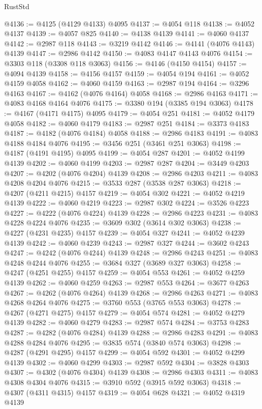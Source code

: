 \begin{lexlean}{RustStd}
\begin{coremodule}
@4136 := @4125 (@4129 @4133) @4095
@4137 := @4054 @118
@4138 := @4052 @4137
@4139 := @4057 @825
@4140 := @4138 @4139
@4141 := @4060 @4137
@4142 := @2987 @118
@4143 := @3219 @4142
@4146 := @4141 (@4076 @4143) @4139
@4147 := @2986 @4142
@4150 := @4083 @4147 @4143 @4076
@4154 := @3303 @118 (@3308 @118 @3063)
@4156 := @4146 (@4150 @4154)
@4157 := @4094 @4139
@4158 := @4156 @4157
@4159 := @4054 @194
@4161 := @4052 @4159 @4058
@4162 := @4060 @4159
@4163 := @2987 @194
@4164 := @3296 @4163
@4167 := @4162 (@4076 @4164) @4058
@4168 := @2986 @4163
@4171 := @4083 @4168 @4164 @4076
@4175 := @3380 @194 (@3385 @194 @3063)
@4178 := @4167 (@4171 @4175) @4095
@4179 := @4054 @251
@4181 := @4052 @4179 @4058
@4182 := @4060 @4179
@4183 := @2987 @251
@4184 := @3373 @4183
@4187 := @4182 (@4076 @4184) @4058
@4188 := @2986 @4183
@4191 := @4083 @4188 @4184 @4076
@4195 := @3456 @251 (@3461 @251 @3063)
@4198 := @4187 (@4191 @4195) @4095
@4199 := @4054 @287
@4201 := @4052 @4199 @4139
@4202 := @4060 @4199
@4203 := @2987 @287
@4204 := @3449 @4203
@4207 := @4202 (@4076 @4204) @4139
@4208 := @2986 @4203
@4211 := @4083 @4208 @4204 @4076
@4215 := @3533 @287 (@3538 @287 @3063)
@4218 := @4207 (@4211 @4215) @4157
@4219 := @4054 @302
@4221 := @4052 @4219 @4139
@4222 := @4060 @4219
@4223 := @2987 @302
@4224 := @3526 @4223
@4227 := @4222 (@4076 @4224) @4139
@4228 := @2986 @4223
@4231 := @4083 @4228 @4224 @4076
@4235 := @3609 @302 (@3614 @302 @3063)
@4238 := @4227 (@4231 @4235) @4157
@4239 := @4054 @327
@4241 := @4052 @4239 @4139
@4242 := @4060 @4239
@4243 := @2987 @327
@4244 := @3602 @4243
@4247 := @4242 (@4076 @4244) @4139
@4248 := @2986 @4243
@4251 := @4083 @4248 @4244 @4076
@4255 := @3684 @327 (@3689 @327 @3063)
@4258 := @4247 (@4251 @4255) @4157
@4259 := @4054 @553
@4261 := @4052 @4259 @4139
@4262 := @4060 @4259
@4263 := @2987 @553
@4264 := @3677 @4263
@4267 := @4262 (@4076 @4264) @4139
@4268 := @2986 @4263
@4271 := @4083 @4268 @4264 @4076
@4275 := @3760 @553 (@3765 @553 @3063)
@4278 := @4267 (@4271 @4275) @4157
@4279 := @4054 @574
@4281 := @4052 @4279 @4139
@4282 := @4060 @4279
@4283 := @2987 @574
@4284 := @3753 @4283
@4287 := @4282 (@4076 @4284) @4139
@4288 := @2986 @4283
@4291 := @4083 @4288 @4284 @4076
@4295 := @3835 @574 (@3840 @574 @3063)
@4298 := @4287 (@4291 @4295) @4157
@4299 := @4054 @592
@4301 := @4052 @4299 @4139
@4302 := @4060 @4299
@4303 := @2987 @592
@4304 := @3828 @4303
@4307 := @4302 (@4076 @4304) @4139
@4308 := @2986 @4303
@4311 := @4083 @4308 @4304 @4076
@4315 := @3910 @592 (@3915 @592 @3063)
@4318 := @4307 (@4311 @4315) @4157
@4319 := @4054 @628
@4321 := @4052 @4319 @4139

\end{coremodule}
\end{lexlean}
